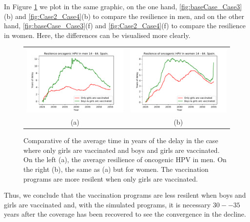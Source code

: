 In Figure \ref{fig:compara_resilencia} we plot in the same graphic, on the one hand,  \ref{fig:baseCase_Case3}(b) and \ref{fig:Case2_Case4}(b) to compare the resilience in men, and on the other hand, \ref{fig:baseCase_Case3}(f) and \ref{fig:Case2_Case4}(f) to compare the resilience in women. Here, the differences can be visualised more clearly.

\begin{figure}[!]
	\centering
	\begin{tabular}{cc}
		\includegraphics[width=0.5\linewidth]{IMGs/11.-Resilencia/compara_resilencia_onco_hom.pdf}	& 
		\includegraphics[width=0.5\linewidth]{IMGs/11.-Resilencia/compara_resilencia_onco_muj.pdf}  \\ 
		(a)	& (b) \\ 
	\end{tabular} 
	\caption{Comparative of the average time in years of the delay in the case where only girls are vaccinated and boys and girls are vaccinated. On the left (a), the average resilience of oncogenic HPV in men. On the right (b), the same as (a) but for women. The vaccination programs are more resilent when only girls are vaccinated.}
	\label{fig:compara_resilencia}
\end{figure}

Thus, we conclude that the vaccination programs are less resilent when boys and girls are vaccinated and, with the simulated programs, it is necessary $30--35$ years after the coverage has been recovered to see the convergence in the decline.
